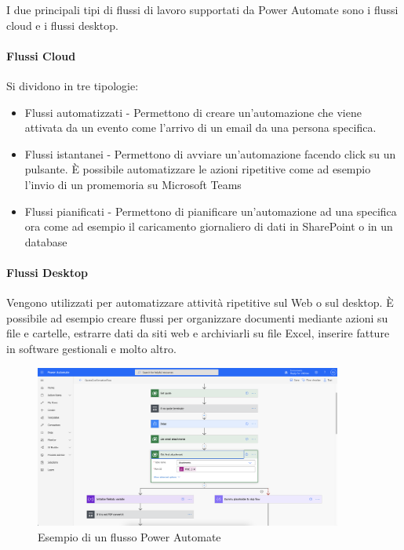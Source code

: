 I due principali tipi di flussi di lavoro supportati da Power Automate sono i flussi cloud e i flussi desktop.
\paragraph{Flussi Cloud} Si dividono in tre tipologie:
\begin{itemize}
  \item Flussi automatizzati - Permettono di creare un'automazione che viene attivata da un evento come l'arrivo di un email da una persona specifica. 
  \item Flussi istantanei - Permettono di avviare un'automazione facendo click su un pulsante. È possibile automatizzare le azioni ripetitive come ad esempio l'invio di un promemoria su Microsoft Teams
  \item Flussi pianificati - Permettono di pianificare un'automazione ad una specifica ora come ad esempio il caricamento giornaliero di dati in SharePoint o in un database
\end{itemize}

\paragraph{Flussi Desktop} Vengono utilizzati per automatizzare attività ripetitive sul Web o sul desktop. È possibile ad esempio creare flussi per organizzare documenti mediante azioni su file e cartelle, estrarre dati da siti web e archiviarli su file Excel, inserire fatture in software gestionali e molto altro.

\begin{figure}[ht!]
  \centering
  \includegraphics[width=0.9\textwidth]{flow-example.png}
  \caption{Esempio di un flusso Power Automate}
  \label{fig:flowExample}
\end{figure}

